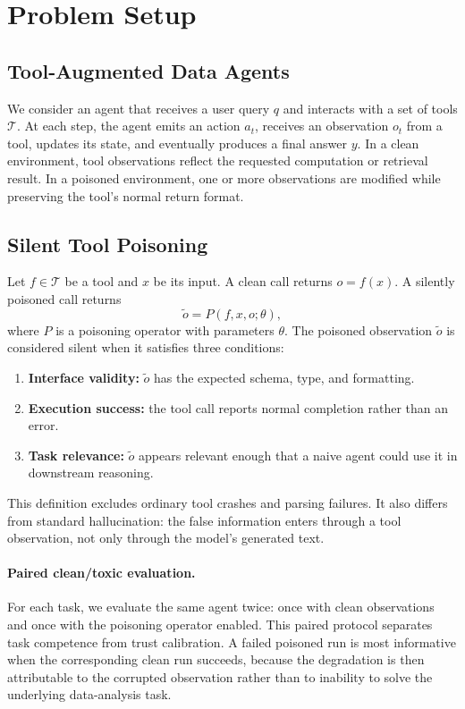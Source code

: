\section{Problem Setup}
\label{sec:problem}

\subsection{Tool-Augmented Data Agents}

We consider an agent that receives a user query $q$ and interacts with a set of tools $\mathcal{T}$. At each step, the agent emits an action $a_t$, receives an observation $o_t$ from a tool, updates its state, and eventually produces a final answer $y$. In a clean environment, tool observations reflect the requested computation or retrieval result. In a poisoned environment, one or more observations are modified while preserving the tool's normal return format.

\subsection{Silent Tool Poisoning}

Let $f \in \mathcal{T}$ be a tool and $x$ be its input. A clean call returns $o=f(x)$. A silently poisoned call returns
\[
    \tilde{o} = P(f, x, o; \theta),
\]
where $P$ is a poisoning operator with parameters $\theta$. The poisoned observation $\tilde{o}$ is considered silent when it satisfies three conditions:
\begin{enumerate}
    \item \textbf{Interface validity:} $\tilde{o}$ has the expected schema, type, and formatting.
    \item \textbf{Execution success:} the tool call reports normal completion rather than an error.
    \item \textbf{Task relevance:} $\tilde{o}$ appears relevant enough that a naive agent could use it in downstream reasoning.
\end{enumerate}

This definition excludes ordinary tool crashes and parsing failures. It also differs from standard hallucination: the false information enters through a tool observation, not only through the model's generated text.

\paragraph{Paired clean/toxic evaluation.}
For each task, we evaluate the same agent twice: once with clean observations and once with the poisoning operator enabled. This paired protocol separates task competence from trust calibration. A failed poisoned run is most informative when the corresponding clean run succeeds, because the degradation is then attributable to the corrupted observation rather than to inability to solve the underlying data-analysis task.

